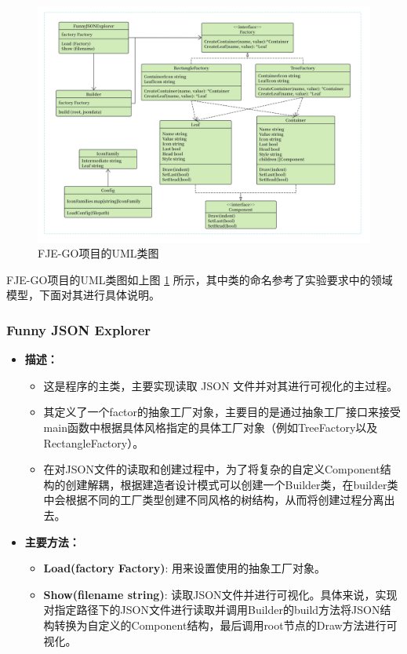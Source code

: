 \documentclass[hyperref,a4paper,UTF8]{ctexart}
\begin{document}
\begin{figure}[H]
    \centering
    \includegraphics[width=1.1\textwidth]{figures/uml-class.png}
    \caption{FJE-GO项目的UML类图}
    \label{fig:uml}
\end{figure}

FJE-GO项目的UML类图如上图 \ref{fig:uml} 所示，其中类的命名参考了实验要求中的领域模型，下面对其进行具体说明。



\subsubsection{Funny JSON Explorer}
\begin{itemize}
    \item \textbf{描述：}
    \begin{itemize}
        \item 这是程序的主类，主要实现读取 JSON 文件并对其进行可视化的主过程。
        \item 其定义了一个factor的抽象工厂对象，主要目的是通过抽象工厂接口来接受main函数中根据具体风格指定的具体工厂对象（例如TreeFactory以及RectangleFactory）。
        \item 在对JSON文件的读取和创建过程中，为了将复杂的自定义Component结构的创建解耦，根据建造者设计模式可以创建一个Builder类，在builder类中会根据不同的工厂类型创建不同风格的树结构，从而将创建过程分离出去。
    \end{itemize}
    \item \textbf{主要方法：}
    \begin{itemize}
        \item \textbf{Load(factory Factory)}: 用来设置使用的抽象工厂对象。
        \item \textbf{Show(filename string)}: 读取JSON文件并进行可视化。具体来说，实现对指定路径下的JSON文件进行读取并调用Builder的build方法将JSON结构转换为自定义的Component结构，最后调用root节点的Draw方法进行可视化。
    \end{itemize}
\end{itemize}
\end{document}
